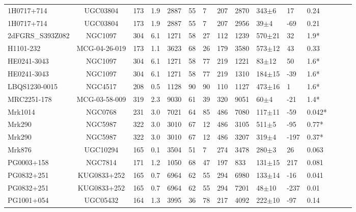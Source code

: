 \begin{landscape}
\begin{center}
\begin{longtable}{l c l l l l l l l l l l l l l}
1H0717+714  				&  UGC03804  					&  173  & 1.9 &  2887  	&  55  &  7  	&  207  &  2870  	&  343$\pm$6  		&  17  	&  0.24   \\
1H0717+714  				&  UGC03804  					&  173  & 1.9 &  2887  	&  55  &  7  	&  207  &  2956  	&  39$\pm$4  		&  -69  	&  0.21  \\
2dFGRS\_S393Z082  		&  NGC1097  					&  304  & 6.1 &  1271  	&  58  &  27  	&  112  &  1239  	&  570$\pm$21  	&  32  	&  1.9*  \\
H1101-232  				&  MCG-04-26-019  				&  173  & 1.1 &  3623  	&  68  &  26  	&  179  &  3580  	&  573$\pm$12  	&  43  	&  0.33  \\
HE0241-3043  				&  NGC1097  					&  304  & 6.1 &  1271  	&  58  &  77  	&  219  &  1221  	&  83$\pm$12  		&  50  	&  1.6*  \\
HE0241-3043  				&  NGC1097  					&  304  & 6.1 &  1271  	&  58  &  77  	&  219  &  1310  	&  184$\pm$15  	&  -39  	&  1.6*  \\
LBQS1230-0015  			&  NGC4517  					&  208  & 0.5 &  1128  	&  90  &  90  	&  110  &  1127  	&  473$\pm$16  	&  1  		&  1.6*  \\
MRC2251-178  			&  MCG-03-58-009  				&  319  & 2.3 &  9030  	&  61  &  39  	&  320  &  9051  	&  60$\pm$4  		&  -21  	&  1.4*  \\
Mrk1014  					&  NGC0768  					&  231  & 3.0 &  7021  	&  64  &  85  	&  486  &  7080  	&  117$\pm$11  	&  -59  	&  0.042*  \\
Mrk290  					&  NGC5987  					&  322  & 3.0 &  3010  	&  67  &  12  	&  486  &  3105  	&  511$\pm$5  		&  -95  	&  0.77*  \\
Mrk290  					&  NGC5987  					&  322  & 3.0 &  3010  	&  67  &  12  	&  486  &  3207  	&  319$\pm$4  		&  -197  	&  0.37*  \\
Mrk876  					&  UGC10294  					&  165  & 0.1 &  3504  	&  51  &  7  	&  274  &  3478  	&  280$\pm$3  		&  26  	&  0.063  \\
PG0003+158  				&  NGC7814  					&  171  & 1.2 &  1050  	&  68  &  47  	&  197  &  833  		&  131$\pm$15  	&  217  	&  0.081  \\
PG0832+251  				&  KUG0833+252  				&  165  & 0.7 &  6964  	&  62  &  55  	&  294  &  6980  	&  133$\pm$14  	&  -16  	&  0.041  \\
PG0832+251  				&  KUG0833+252  				&  165  & 0.7 &  6964  	&  62  &  55  	&  294  &  7201  	&  48$\pm$10  		&  -237  	&  0.01  \\
PG1001+054  				&  UGC05432  					&  164  & 1.3 &  3995  	&  36  &  78  	&  217  &  4092  	&  222$\pm$10  	&  -97  	&  0.14  \\

\end{longtable}
\end{center}
\end{landscape}
